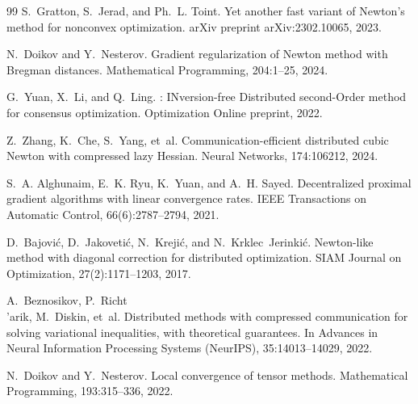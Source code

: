 \documentclass[review,onefignum,onetabnum]{siamart171218}
\begin{document}
\begin{thebibliography}{99}
		S.~Gratton, S.~Jerad, and Ph.~L. Toint.
		\newblock Yet another fast variant of {N}ewton's method for nonconvex optimization.
		\newblock arXiv preprint arXiv:2302.10065, 2023.
		
		N.~Doikov and Y.~Nesterov.
		\newblock Gradient regularization of {N}ewton method with {B}regman distances.
		\newblock Mathematical Programming, 204:1--25, 2024.
		
		G.~Yuan, X.~Li, and Q.~Ling.
		: {IN}version-free {D}istributed second-{O}rder method for consensus optimization.
		\newblock Optimization Online preprint, 2022.
		
		Z.~Zhang, K.~Che, S.~Yang, et~al.
		\newblock Communication-efficient distributed cubic {N}ewton with compressed lazy {H}essian.
		\newblock Neural Networks, 174:106212, 2024.
		
		S.~A. Alghunaim, E.~K. Ryu, K.~Yuan, and A.~H. Sayed.
		\newblock Decentralized proximal gradient algorithms with linear convergence rates.
		\newblock IEEE Transactions on Automatic Control, 66(6):2787--2794, 2021.
		
		D.~Bajovi{\'c}, D.~Jakoveti{\'c}, N.~Kre\-ji{\'c}, and N.~Krklec~Jerinki{\'c}.
		\newblock Newton-like method with diagonal correction for distributed optimization.
		\newblock SIAM Journal on Optimization, 27(2):1171--1203, 2017.
		
		A.~Beznosikov, P.~Richt{\\'a}rik, M.~Diskin, et~al.
		\newblock Distributed methods with compressed communication for solving variational inequalities, with theoretical guarantees.
		\newblock In Advances in Neural Information Processing Systems (NeurIPS), 35:14013--14029, 2022.
		
		N.~Doikov and Y.~Nesterov.
		\newblock Local convergence of tensor methods.
		\newblock Mathematical Programming, 193:315--336, 2022.
		

\end{thebibliography}
\end{document}
